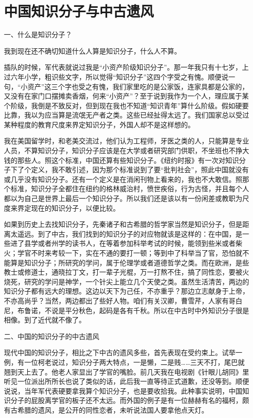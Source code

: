 \chapter{中国知识分子与中古遗风}

一、什么是知识分子？ 

我到现在还不确切知道什么人算是知识分子，什么人不算。 

插队的时候，军代表就说过我是“小资产阶级知识分子”。那一年我只有十七岁，上过六年小学，粗识些文字，所以觉得“知识分子”这四个字受之有愧。顺便说一句，“小资产”这三个字也受之有愧，我们家里吃的是公家饭，连家具都是公家的，又没有在家门口摆摊卖香烟，何来“小资产”？至于说到我作为一个人，理应属于某个阶级，我倒是不致反对，但到现在我也不知道“知识青年”算什么阶级。假如硬要比靠，我以为应当算是流氓无产者之类。这些已经扯得太远了。我们国家总以受过某种程度的教育尺度来界定知识分子，外国人却不是这样想的。 

我在美国留学时，和老美交流过，他们认为工程师，牙医之类的人，只能算是专业人员，不算知识分子，知识分子应该是在大学或者研究部门供职，不坐班也不挣大钱的那些人。照这个标准，中国还算有些知识分子。《纽约时报》有一次对知识分子下了个定义，我不敢引述，因为那个标准说到了要“批判社会”，照此中国就没有或几乎没有知识分子。还有一个定义是在消闲刊物上看来的，我也不大敢信。照那个标准，知识分子全都住在纽约的格林威治村，愤世疾俗，行为古怪，并且每个人都以为自己是世界上最后一个知识分子。所以我们还是该以有一份闲差或教职为尺度来界定现在的知识分子，以便比较。 

如果到历史上去找知识分子，先秦诸子和古希腊的哲学家当然是知识分子，但是距离太遥远。到了中古，我们找到的知识分子的对应物就该是这样的：在中国，是一些进了县学或者州学的读书人，在等着参加科举考试的时候，能领到些米或者柴火；学官不时来考较一下，实在不通的要打一顿；等到中了科举当了官，恐怕就不能算是知识分子；所研究的学问，属于伦理学或者道德哲学之类。而在欧洲，是些教士或修道士，通晓拉丁文，打一辈子光棍，万一打熬不住，搞了同性恋，要被火烧死，研究的学问是神学，一个针尖上能立几个天使之类。虽然生活清苦，两边的知识分子都有远大的理想。这边以天下为己任，不亦重乎？那边立志献身于上帝，不亦高尚乎？当然，两边都出了些好人物。咱们有关汉卿，曹雪芹，人家有哥白尼，布鲁诺，不说是平分秋色，起码是各有千秋。所以在中古时中外知识分子很是相像。到了近代就不像了。 

二、中国的知识分子的中古遗风 

现代中国的知识分子，相比之下中古的遗风多些，首先表现在受约束上。试举一例，有一位柯老说过，知识分子两大特点，一是懒，二是贱……三天不打，尾巴就翘到天上去了。他老人家显出了学官的嘴脸。前几天我在电视剧《针眼儿胡同》里听见一位派出所所长也说了类似的话，此后我一直等待正式道歉，还没等到。顺便说说，当年军代表硬要拿我算个知识分子，也是要收拾我。此种事实说明，中国知识分子的屁股离学官的板子还不太远。而外国的例子是有一位赫赫有名的福柯，颇有古希腊的遗风，是公开的同性恋者，未听说法国人要拿他点天灯。 


